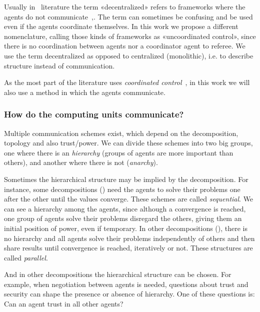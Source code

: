 \documentclass[../main.tex]{subfiles}
\begin{document}
\begin{remark}
  Usually in \dmpc\ literature the term «decentralized» refers to frameworks where the agents do not communicate~\cite[\S 4]{ChristofidesEtAl2013},\cite{NegenbornMaestre2014}.
  The term can sometimes be confusing and be used even if the agents coordinate themselves.
  In this work we propose a different nomenclature, calling those kinds of frameworks as «uncoordinated control», since there is no coordination between agents nor a coordinator agent to referee. We use the term decentralized as opposed to centralized (monolithic), i.e. to describe structure instead of communication.
\end{remark}

As the most part of the literature uses \emph{coordinated control}~\cite{NegenbornMaestre2014, ArauzEtAl2021}, in this work we will also use a method in which the agents communicate.


\subsubsection{How do the computing units communicate?}

Multiple communication schemes exist, which depend on the decomposition, topology and also trust/power.
We can divide these schemes into two big groups, one where there is an \emph{hierarchy} (groups of agents are more important than others), and another where there is not (\emph{anarchy}).

Sometimes the hierarchical structure may be implied by the decomposition. For instance, some decompositions () need the agents to solve their problems one after the other until the values converge.
These schemes are called \emph{sequential}.
We can see a hierarchy among the agents, since although a convergence is reached, one group of agents solve their problems disregard the others, giving them an initial position of power, even if temporary.
In other decompositions (), there is no hierarchy and all agents solve their problems independently of others and then share results until convergence is reached, iteratively or not.
These structures are called \emph{parallel}.

And in other decompositions the hierarchical structure can be chosen.
For example, when negotiation between agents is needed, questions about trust and security can shape the presence or absence of hierarchy.
One of these questions is: Can an agent trust in all other agents?
\end{document}
